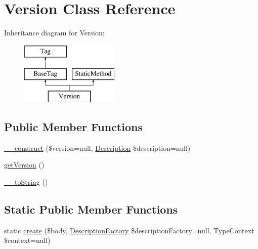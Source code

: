 \hypertarget{classphp_documentor_1_1_reflection_1_1_doc_block_1_1_tags_1_1_version}{}\section{Version Class Reference}
\label{classphp_documentor_1_1_reflection_1_1_doc_block_1_1_tags_1_1_version}
Inheritance diagram for Version\+:\begin{figure}[H]
\begin{center}
\leavevmode
\includegraphics[height=3.000000cm]{classphp_documentor_1_1_reflection_1_1_doc_block_1_1_tags_1_1_version}
\end{center}
\end{figure}
\subsection*{Public Member Functions}
\begin{DoxyCompactItemize}
\item 
\mbox{\hyperlink{classphp_documentor_1_1_reflection_1_1_doc_block_1_1_tags_1_1_version_a75f67561d733f42ea52230c5b289d264}{\+\_\+\+\_\+construct}} (\$version=null, \mbox{\hyperlink{classphp_documentor_1_1_reflection_1_1_doc_block_1_1_description}{Description}} \$description=null)
\item 
\mbox{\hyperlink{classphp_documentor_1_1_reflection_1_1_doc_block_1_1_tags_1_1_version_afa8e7a3a646144eab50188b7a805a389}{get\+Version}} ()
\item 
\mbox{\hyperlink{classphp_documentor_1_1_reflection_1_1_doc_block_1_1_tags_1_1_version_a7516ca30af0db3cdbf9a7739b48ce91d}{\+\_\+\+\_\+to\+String}} ()
\end{DoxyCompactItemize}
\subsection*{Static Public Member Functions}
\begin{DoxyCompactItemize}
\item 
static \mbox{\hyperlink{classphp_documentor_1_1_reflection_1_1_doc_block_1_1_tags_1_1_version_a11e724d29317978c2b5add32da21a158}{create}} (\$body, \mbox{\hyperlink{classphp_documentor_1_1_reflection_1_1_doc_block_1_1_description_factory}{Description\+Factory}} \$description\+Factory=null, Type\+Context \$context=null)
\end{DoxyCompactItemize}
